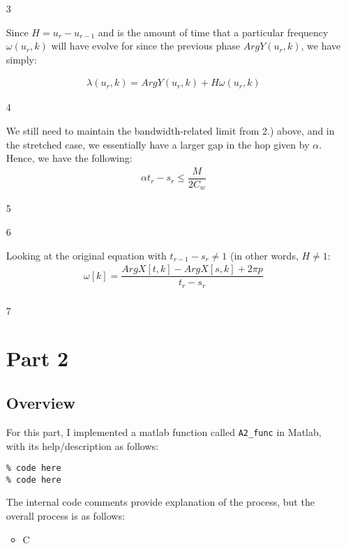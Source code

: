 \documentclass[12pt]{article}
\begin{document}
\begin{enumerate}
\item[3]{

Since $H = u_r-u_{r-1}$ and is the amount of time that a particular frequency $\omega(u_r,k)$ will have evolve for since the previous phase $Arg Y (u_r,k)$, we have simply:

\begin{align*}
\lambda(u_r, k) = Arg Y (u_r,k) +H\omega(u_r,k)
\end{align*}

}

\item[4]{

We still need to maintain the bandwidth-related limit from 2.) above, and in the stretched case, we essentially have a larger gap in the hop given by $\alpha$. Hence, we have the following:
\begin{align*}
\alpha t_r - s_r \leq \dfrac{M}{2C_w}
\end{align*}

}

\item[5]{

}

\item[6]{

Looking at the original equation with $t_{r-1}-s_r  \neq 1$ (in other words, $H \neq 1$:
\begin{align*}
\omega[k] = \dfrac{Arg X [t,k] - Arg X [s, k] + 2\pi p}{t_r-s_r}\\
\end{align*}

}

\item[7]{

}

\newpage

\section*{Part 2}

\subsection*{Overview}
For this part, I implemented a matlab function called \verb|A2_func| in Matlab, with its help/description as follows:

\begin{verbatim}
% code here
% code here
\end{verbatim}

The internal code comments provide explanation of the process, but the overall process is as follows:

\begin{itemize}
\item{C}
\end{itemize}

\end{enumerate}
\end{document}
